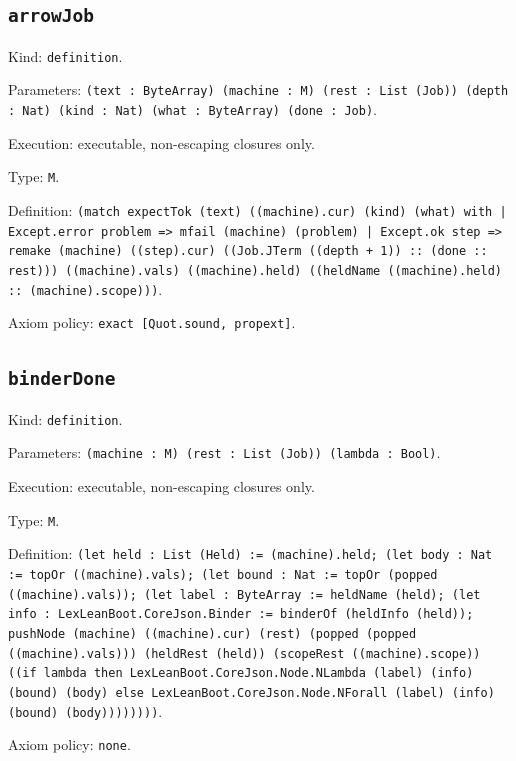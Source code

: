 \documentclass[11pt]{article}
\begin{document}
\subsection*{\texttt{arrowJob}}
\noindent Kind: \texttt{definition}.\par
\noindent Parameters: \texttt{(text : ByteArray) (machine : M) (rest : List (Job)) (depth : Nat) (kind : Nat) (what : ByteArray) (done : Job)}.\par
\noindent Execution: executable, non-escaping closures only.\par
\noindent Type: \texttt{M}.\par
\noindent Definition: \texttt{(match expectTok (text) ((machine).cur) (kind) (what) with | Except.error problem => mfail (machine) (problem) | Except.ok step => remake (machine) ((step).cur) ((Job.JTerm ((depth + 1)) :: (done :: rest))) ((machine).vals) ((machine).held) ((heldName ((machine).held) :: (machine).scope)))}.\par
\noindent Axiom policy: \texttt{exact [Quot.sound, propext]}.\par
\subsection*{\texttt{binderDone}}
\noindent Kind: \texttt{definition}.\par
\noindent Parameters: \texttt{(machine : M) (rest : List (Job)) (lambda : Bool)}.\par
\noindent Execution: executable, non-escaping closures only.\par
\noindent Type: \texttt{M}.\par
\noindent Definition: \texttt{(let held : List (Held) := (machine).held; (let body : Nat := topOr ((machine).vals); (let bound : Nat := topOr (popped ((machine).vals)); (let label : ByteArray := heldName (held); (let info : LexLeanBoot.CoreJson.Binder := binderOf (heldInfo (held)); pushNode (machine) ((machine).cur) (rest) (popped (popped ((machine).vals))) (heldRest (held)) (scopeRest ((machine).scope)) ((if lambda then LexLeanBoot.CoreJson.Node.NLambda (label) (info) (bound) (body) else LexLeanBoot.CoreJson.Node.NForall (label) (info) (bound) (body))))))))}.\par
\noindent Axiom policy: \texttt{none}.\par
\end{document}
